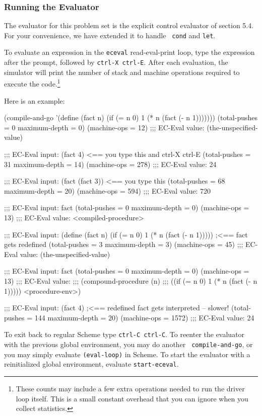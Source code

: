 \subsubsection{Running the Evaluator}

The evaluator for this problem set is the explicit control evaluator of
section 5.4.  For your convenience, we have extended it to handle {\tt
cond} and {\tt let}.

To evaluate an expression in the {\tt eceval} read-eval-print loop,
type the expression after the prompt, followed by {\tt ctrl-X ctrl-E}.
After each evaluation, the simulator will print the number of stack
and machine operations required to execute the code.\footnote{These
counts may include a few extra operations needed to run the driver
loop itself.  This is a small constant overhead that you can ignore
when you collect statistics.}

Here is an example:

\beginlisp
(compile-and-go
 '(define (fact n) (if (= n 0) 1 (* n (fact (- n 1)))))))
(total-pushes = 0 maximum-depth = 0)
(machine-ops = 12)
;;; EC-Eval value:  (the-unspecified-value)
\endlisp

\beginlisp
;;; EC-Eval input: (fact 4)          <== you type this and ctrl-X ctrl-E
(total-pushes = 31 maximum-depth = 14)
(machine-ops = 278)
;;; EC-Eval value: 24
\endlisp

\beginlisp
;;; EC-Eval input: (fact (fact 3))   <== you type this
(total-pushes = 68 maximum-depth = 20)
(machine-ops = 594)
;;; EC-Eval value: 720
\endlisp

\beginlisp
;;; EC-Eval input: fact
(total-pushes = 0 maximum-depth = 0)
(machine-ops = 13)
;;; EC-Eval value: <compiled-procedure>
\endlisp

\beginlisp
;;; EC-Eval input:
(define (fact n) (if (= n 0) 1 (* n (fact (- n 1))))) ;<== fact gets redefined
(total-pushes = 3 maximum-depth = 3)
(machine-ops = 45)
;;; EC-Eval value: (the-unspecified-value)
\endlisp

\beginlisp
;;; EC-Eval input: fact
(total-pushes = 0 maximum-depth = 0)
(machine-ops = 13)
;;; EC-Eval value:
;;;  (compound-procedure (n)
;;;    ((if (= n 0) 1 (* n (fact (- n 1))))) <procedure-env>)
\endlisp

\beginlisp
;;; EC-Eval input:
(fact 4)                ;<== redefined fact gets interpreted -- slower!
(total-pushes = 144 maximum-depth = 20)
(machine-ops = 1572)
;;; EC-Eval value: 24
\endlisp

To exit back to regular Scheme type {\tt ctrl-C ctrl-C}.  To reenter the
evaluator with the previous global environment, you may do another {\tt
compile-and-go}, or you may simply evaluate {\tt (eval-loop)} in Scheme.
To start the evaluator with a reinitialized global environment, evaluate
{\tt start-eceval}.


